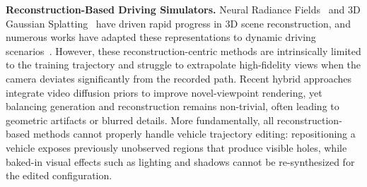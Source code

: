 \documentclass[runningheads]{llncs}
\begin{document}

\textbf{Reconstruction-Based Driving Simulators.}
Neural Radiance Fields~\cite{mildenhall2020nerf} and 3D Gaussian Splatting~\cite{kerbl20233d} have driven rapid progress in 3D scene reconstruction, and numerous works have adapted these representations to dynamic driving scenarios~\cite{huang2024s3gaussian,chen2026periodic,wu2023mars,guo2023streetsurf,turki2023suds,yang2023unisim,tonderski2024neurad,zhou2024drivinggaussian,yan2024street}. However, these reconstruction-centric methods are intrinsically limited to the training trajectory and struggle to extrapolate high-fidelity views when the camera deviates significantly from the recorded path. Recent hybrid approaches~\cite{fan2025freesim,zhao2024drive,ni2025recondreamer,yan2025streetcrafter} integrate video diffusion priors to improve novel-viewpoint rendering, yet balancing generation and reconstruction remains non-trivial, often leading to geometric artifacts or blurred details. More fundamentally, all reconstruction-based methods cannot properly handle vehicle trajectory editing: repositioning a vehicle exposes previously unobserved regions that produce visible holes, while baked-in visual effects such as lighting and shadows cannot be re-synthesized for the edited configuration.
\end{document}
